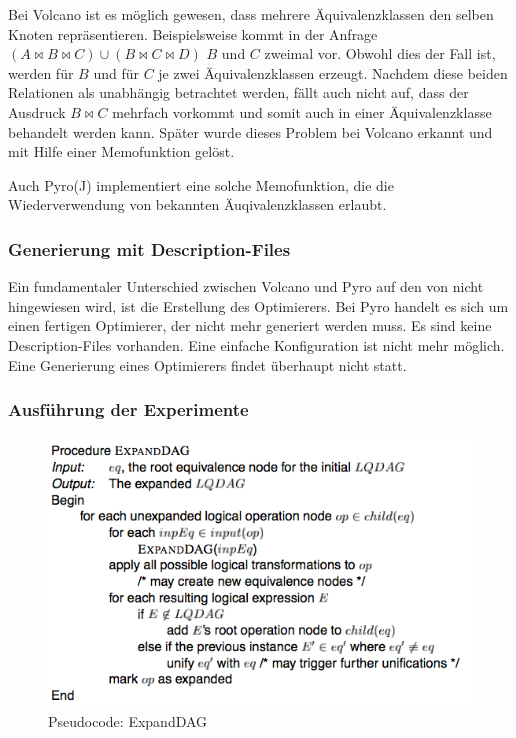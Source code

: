 Bei Volcano ist es möglich gewesen, dass mehrere Äquivalenzklassen den selben Knoten repräsentieren. Beispielsweise kommt in der Anfrage $(A \Join B \Join C) \cup (B \Join C \Join D)$ $B$ und $C$ zweimal vor. Obwohl dies der Fall ist, werden für $B$ und für $C$ je zwei Äquivalenzklassen erzeugt. Nachdem diese beiden Relationen als unabhängig betrachtet werden, fällt auch nicht auf, dass der Ausdruck $B \Join C$ mehrfach vorkommt und somit auch in einer Äquivalenzklasse behandelt werden kann. Später wurde dieses Problem bei Volcano erkannt und mit Hilfe einer Memofunktion gelöst.

Auch Pyro(J) implementiert eine solche Memofunktion, die die Wiederverwendung von bekannten Äuqivalenzklassen erlaubt.


\subsubsection{Generierung mit Description-Files}

Ein fundamentaler Unterschied zwischen Volcano und Pyro auf den von \cite{roy2001multi} nicht hingewiesen wird, ist die Erstellung des Optimierers. Bei Pyro handelt es sich um einen fertigen Optimierer, der nicht mehr generiert werden muss. Es sind keine Description-Files vorhanden. Eine einfache Konfiguration ist nicht mehr möglich. Eine Generierung eines Optimierers findet überhaupt nicht statt.


\subsubsection{Ausführung der Experimente}


\begin{figure}[ht]
  \centering
  \includegraphics[scale=0.75]{02_Related_Work/ExpandDAG.png}
  \caption{Pseudocode: ExpandDAG}
  \label{ExpandDAG}
\end{figure}

